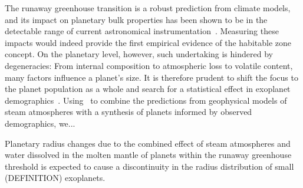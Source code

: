 \documentclass[twocolumn]{aastex631}
\begin{document}
\begin{note}
    The runaway greenhouse transition is a robust prediction from climate models, and its impact on planetary bulk properties has been shown to be in the detectable range of current astronomical instrumentation~\citep{Goldblatt2015}.
Measuring these impacts would indeed provide the first empirical evidence of the habitable zone concept.
On the planetary level, however, such undertaking is hindered by degeneracies: From internal composition to atmospheric loss to volatile content, many factors influence a planet's size.
It is therefore prudent to shift the focus to the planet population as a whole and search for a statistical effect in exoplanet demographics~\citep{Turbet2019}.
 Using \bioverse\ to combine the predictions from geophysical models of steam atmospheres with a synthesis of planets informed by observed demographics, we...



    Planetary radius changes due to the combined effect of steam atmospheres and water dissolved in the molten mantle of planets within the runaway greenhouse threshold is expected to cause a discontinuity in the radius distribution of small (DEFINITION) exoplanets.


\end{note}
\end{document}
